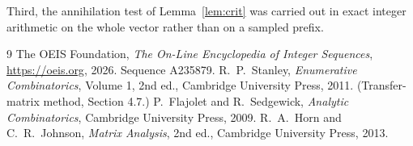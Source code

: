 \documentclass[11pt,a4paper]{article}
\theoremstyle{plain}
\theoremstyle{definition}
\begin{document}
Third, the annihilation test of Lemma~\ref{lem:crit} was carried out in exact integer
arithmetic on the whole vector rather than on a sampled prefix.

\begin{thebibliography}{9}
 The OEIS Foundation, \emph{The On-Line Encyclopedia of Integer
Sequences}, \url{https://oeis.org}, 2026. Sequence A235879.
 R.~P.~Stanley, \emph{Enumerative Combinatorics}, Volume 1, 2nd ed.,
Cambridge University Press, 2011. (Transfer-matrix method, Section 4.7.)
 P.~Flajolet and R.~Sedgewick, \emph{Analytic Combinatorics}, Cambridge
University Press, 2009.
 R.~A.~Horn and C.~R.~Johnson, \emph{Matrix Analysis}, 2nd ed., Cambridge
University Press, 2013.
\end{thebibliography}
\end{document}

